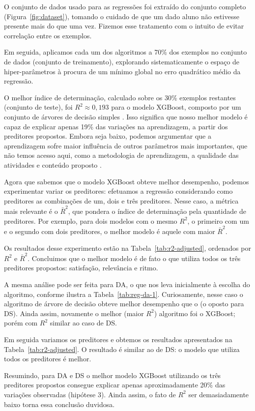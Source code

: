 O conjunto de dados usado para as regressões foi extraído do conjunto completo (Figura~\ref{fig:dataset}), tomando o cuidado de que um dado aluno não estivesse presente mais do que uma vez.
Fizemos esse tratamento com o intuito de evitar correlação entre os exemplos.

Em seguida, aplicamos cada um dos algoritmos a 70\% dos exemplos no conjunto de dados (conjunto de treinamento), explorando sistematicamente o espaço de hiper-parâmetros à procura de um mínimo global no erro quadrático médio da regressão.

O melhor índice de determinação, calculado sobre os 30\% exemplos restantes (conjunto de teste), foi $R^2 \approx 0,193$ para o modelo XGBoost, composto por um conjunto de árvores de decisão simples \cite{Friedman2001}.
Isso significa que nosso melhor modelo é capaz de explicar apenas 19\% das variações na aprendizagem, a partir dos preditores propostos.
Embora seja baixo, podemos argumentar  que a aprendizagem sofre maior influência de outros parâmetros mais importantes, que não temos acesso aqui, como a metodologia de aprendizagem, a qualidade das atividades e conteúdo proposto \etc.



Agora que sabemos que o modelo XGBoost obteve melhor desempenho, podemos experimentar variar os preditores: efetuamos a regressão considerando como preditores as combinações de um, dois e três preditores.
Nesse caso, a métrica mais relevante é o $\bar R^2$, que pondera o índice de determinação pela quantidade de preditores.
Por exemplo, para dois modelos com o mesmo $R^2$, o primeiro com um e o segundo com dois preditores, o melhor modelo é aquele com maior $\bar R^2$.

Os resultados desse experimento estão na Tabela~\ref{tab:r2-adjusted}, ordenados por $R^2$ e $\bar R^2$.
Concluimos que o melhor modelo é de fato o que utiliza todos os três preditores propostos: satisfação, relevância e ritmo.



A mesma análise pode ser feita para DA, o que nos leva inicialmente à escolha do algoritmo, conforme ilustra a Tabela~\ref{tab:reg-da-1}.
Curiosamente, nesse caso o algoritmo de árvore de decisão obteve melhor desempenho que o  (o oposto para DS).
Ainda assim, novamente o melhor (maior $R^2$) algoritmo foi o XGBoost; porém com $R^2$ similar ao caso de DS.

Em seguida variamos os preditores e obtemos os resultados apresentados na Tabela~\ref{tab:r2-adjusted}.
O resultado é similar ao de DS: o modelo que utiliza todos os preditores é melhor.



Resumindo, para DA e DS o melhor modelo XGBoost utilizando os três preditores propostos consegue explicar apenas aproximadamente 20\% das variações observadas (hipótese 3).
Ainda assim, o fato de $R^2$ ser demasiadamente baixo torna essa conclusão duvidosa.
